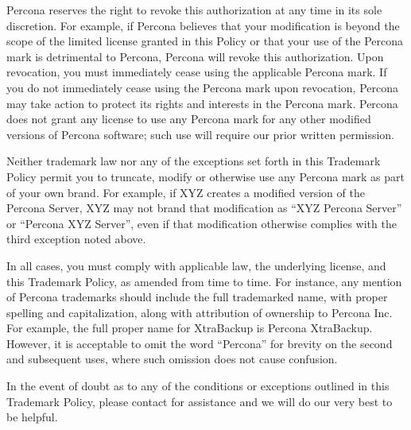 \documentclass[letterpaper,10pt,english]{sphinxmanual}
\begin{document}
\sphinxAtStartPar
Percona reserves the right to revoke this authorization at any time in its sole
discretion. For example, if Percona believes that your modification is beyond
the scope of the limited license granted in this Policy or that your use of the
Percona mark is detrimental to Percona, Percona will revoke this authorization.
Upon revocation, you must immediately cease using the applicable Percona mark.
If you do not immediately cease using the Percona mark upon revocation, Percona
may take action to protect its rights and interests in the Percona mark.
Percona does not grant any license to use any Percona mark for any other
modified versions of Percona software; such use will require our prior written
permission.

\sphinxAtStartPar
Neither trademark law nor any of the exceptions set forth in this Trademark
Policy permit you to truncate, modify or otherwise use any Percona mark as part
of your own brand. For example, if XYZ creates a modified version of the
Percona Server, XYZ may not brand that modification as “XYZ Percona Server” or
“Percona XYZ Server”, even if that modification otherwise complies with the
third exception noted above.

\sphinxAtStartPar
In all cases, you must comply with applicable law, the underlying license, and
this Trademark Policy, as amended from time to time. For instance, any mention
of Percona trademarks should include the full trademarked name, with proper
spelling and capitalization, along with attribution of ownership to Percona
Inc. For example, the full proper name for XtraBackup is Percona XtraBackup.
However, it is acceptable to omit the word “Percona” for brevity on the second
and subsequent uses, where such omission does not cause confusion.

\sphinxAtStartPar
In the event of doubt as to any of the conditions or exceptions outlined in
this Trademark Policy, please contact  for assistance and
we will do our very best to be helpful.



\renewcommand{\indexname}{Index}
\printindex
\end{document}
